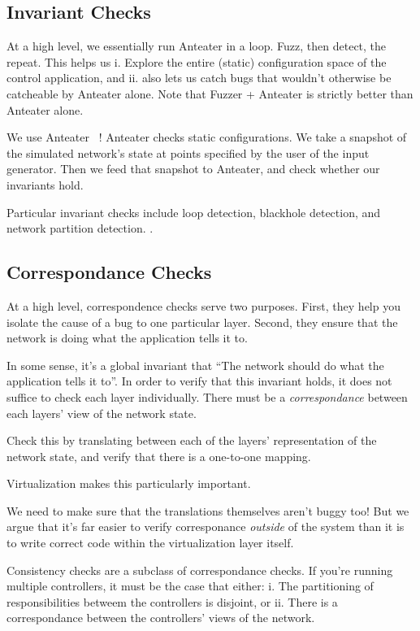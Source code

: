 

\subsection{Invariant Checks}

At a high level, we essentially run Anteater in a loop. Fuzz, then detect, the
repeat. This helps us i. Explore the entire (static) configuration space of the control
application, and ii. also lets us catch bugs that wouldn't otherwise be
catcheable by Anteater alone. Note that Fuzzer + Anteater is strictly better than Anteater alone.

We use Anteater ~\cite{anteater}! Anteater checks static configurations. We take a snapshot of
the simulated network's state at points specified by the user of the input
generator. Then we feed that snapshot to Anteater, and check whether our
invariants hold.

Particular invariant checks include loop detection, blackhole detection, and
network partition detection. . 

\subsection{Correspondance Checks}


At a high level, correspondence checks serve two purposes. First, they help
you isolate the cause of a bug to one particular layer. Second, they ensure
that the network is doing what the application tells it to.

In some sense, it's a global invariant that ``The network should do what the
application tells it to''. In order to verify that this invariant holds, it
does not suffice to check each layer individually. There must be a {\it
correspondance} between each layers' view of the network state.

Check this by translating between each of the layers' representation of the
network state, and verify that there is a one-to-one mapping. 

Virtualization makes this particularly important.

We need to make sure that the translations themselves aren't buggy too! But we
argue that it's far easier to verify corresponance {\it outside} of the system
than it is to write correct code within the virtualization layer itself.

Consistency checks are a subclass of correspondance checks. If you're running
multiple controllers, it must be the case that either: i. The partitioning of
responsibilities betweem the controllers is disjoint, or ii. There is a
correspondance between the controllers' views of the network.


